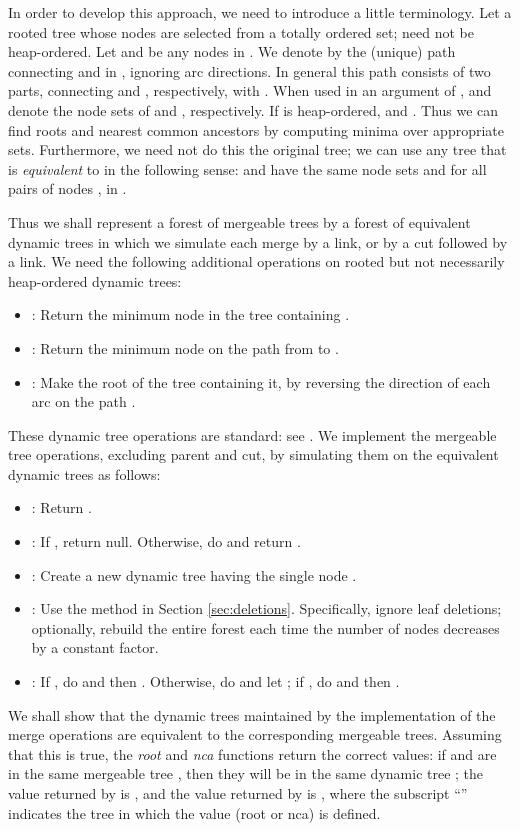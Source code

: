 \documentclass[twoside,leqno,twocolumn]{article}
\begin{document}
In order to develop this approach, we need to introduce a little terminology.  Let  a rooted tree whose nodes are selected from a totally ordered set;  need not be heap-ordered.  Let  and  be any nodes in .  We denote by  the (unique) path connecting  and  in , ignoring arc directions.  In general this path consists of two parts, connecting  and , respectively, with .  When used in an argument of ,  and  denote the node sets of  and , respectively.  If  is heap-ordered,  and .  Thus we can find roots and nearest common ancestors by computing minima over appropriate sets.  Furthermore, we need not do this the original tree; we can use any tree  that is \emph{equivalent} to  in the following sense:  and  have the same node sets and  for all pairs of nodes ,  in .

Thus we shall represent a forest of mergeable trees by a forest of equivalent dynamic trees in which we simulate each merge by a link, or by a cut followed by a link.  We need the following additional operations on rooted but not necessarily heap-ordered dynamic trees:
\begin{itemize}
\item : Return the minimum node in the tree containing .
\item : Return the minimum node on the path from  to .
\item : Make  the root of the tree containing it, by reversing the direction of each arc on the path .
\end{itemize}
These dynamic tree operations are standard: see \cite{AHTdL05,GGT91,ST83,ST85,TW05}.  We implement the mergeable tree operations, excluding parent and cut, by simulating them on the equivalent dynamic trees  as follows:
\begin{itemize}
\item : Return .
\item : If , return null. Otherwise, do  and return .
\item : Create a new dynamic tree having the single node .
\item : Use the method in Section \ref{sec:deletions}.  Specifically, ignore leaf deletions; optionally, rebuild the entire forest each time the number of nodes decreases by a constant factor.
\item : If , do  and then . Otherwise, do  and let ; if , do  and then .
\end{itemize}
We shall show that the dynamic trees maintained by the implementation of the merge operations are equivalent to the corresponding mergeable trees.  Assuming that this is true, the \emph{root} and \emph{nca} functions return the correct values: if  and  are in the same  mergeable tree , then they will be in the same dynamic tree ; the value returned by   is , and the value returned by  is , where the subscript ``'' indicates the tree in which the value (root or nca) is defined.
\end{document}
